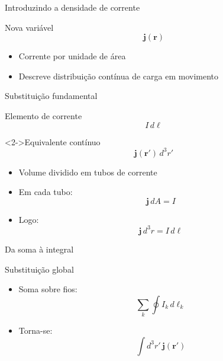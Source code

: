 \documentclass[aspectratio=169]{beamer}
\begin{document}
\begin{frame}{Introduzindo a densidade de corrente}

\begin{block}{Nova variável}
\[
\mathbf j(\mathbf r)
\]
\end{block}

\begin{itemize}
\item<2-> Corrente por unidade de área
\item<3-> Descreve distribuição contínua de carga em movimento
\end{itemize}


\end{frame}

\begin{frame}{Substituição fundamental}

\begin{block}{Elemento de corrente}
\[
I\, d\boldsymbol{\ell}
\]
\end{block}

\begin{block}<2->{Equivalente contínuo}
\[
\mathbf j(\mathbf r')\, d^3r'
\]
\end{block}

\begin{itemize}
\item<3-> Volume dividido em tubos de corrente
\item<4-> Em cada tubo:
\[
\mathbf j\,dA = I
\]
\item<5-> Logo:
\[
\mathbf j\,d^3r = I\,d\boldsymbol{\ell}
\]
\end{itemize}

\end{frame}

\begin{frame}{Da soma à integral}

\begin{block}{Substituição global}
\begin{itemize}
\item<1-> Soma sobre fios:
\[
\sum_k \oint I_k\, d\boldsymbol{\ell}_k
\]
\item<2-> Torna-se:
\[
\int d^3r'\, \mathbf j(\mathbf r')
\]
\end{itemize}
\end{block}


\end{frame}
\end{document}

